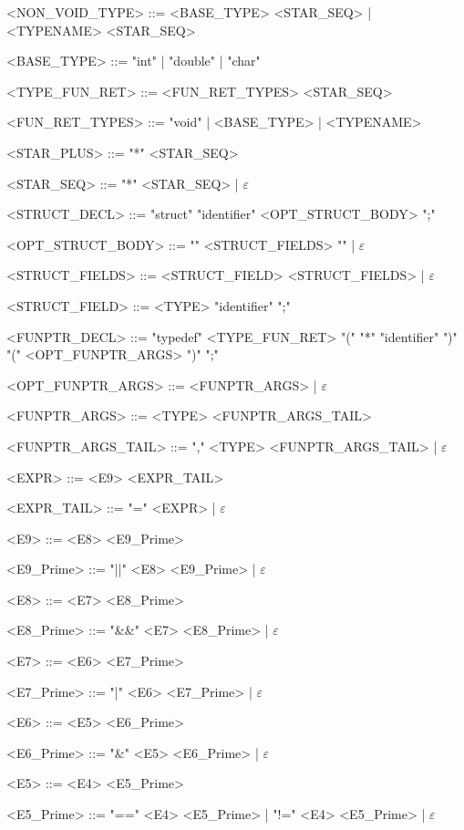 \begin{grammar}
<NON\_VOID\_TYPE> ::= <BASE\_TYPE> <STAR\_SEQ>
                    | <TYPENAME> <STAR\_SEQ>

<BASE\_TYPE> ::= "int"
               | "double"
               | "char"

<TYPE\_FUN\_RET> ::= <FUN\_RET\_TYPES> <STAR\_SEQ>

<FUN\_RET\_TYPES> ::= "void"
                    | <BASE\_TYPE>
                    | <TYPENAME>

<STAR\_PLUS> ::= "*" <STAR\_SEQ>

<STAR\_SEQ> ::= "*" <STAR\_SEQ>
              | $\varepsilon$

<STRUCT\_DECL> ::= "struct" "identifier" <OPT\_STRUCT\_BODY> ";"

<OPT\_STRUCT\_BODY> ::= "{" <STRUCT\_FIELDS> "}"
                      | $\varepsilon$

<STRUCT\_FIELDS> ::= <STRUCT\_FIELD> <STRUCT\_FIELDS>
                   | $\varepsilon$

<STRUCT\_FIELD> ::= <TYPE> "identifier" ";"

<FUNPTR\_DECL> ::= "typedef" <TYPE\_FUN\_RET> "(" "*" "identifier" ")" "(" <OPT\_FUNPTR\_ARGS> ")" ";"

<OPT\_FUNPTR\_ARGS> ::= <FUNPTR\_ARGS>
                      | $\varepsilon$

<FUNPTR\_ARGS> ::= <TYPE> <FUNPTR\_ARGS\_TAIL>

<FUNPTR\_ARGS\_TAIL> ::= "," <TYPE> <FUNPTR\_ARGS\_TAIL>
                       | $\varepsilon$

<EXPR> ::= <E9> <EXPR\_TAIL>

<EXPR\_TAIL> ::= "=" <EXPR>
               | $\varepsilon$

<E9> ::= <E8> <E9\_Prime>

<E9\_Prime> ::= "||" <E8> <E9\_Prime>
              | $\varepsilon$

<E8> ::= <E7> <E8\_Prime>

<E8\_Prime> ::= "&&" <E7> <E8\_Prime>
              | $\varepsilon$

<E7> ::= <E6> <E7\_Prime>

<E7\_Prime> ::= "|" <E6> <E7\_Prime>
              | $\varepsilon$

<E6> ::= <E5> <E6\_Prime>

<E6\_Prime> ::= "&" <E5> <E6\_Prime>
              | $\varepsilon$

<E5> ::= <E4> <E5\_Prime>

<E5\_Prime> ::= "==" <E4> <E5\_Prime>
              | "!=" <E4> <E5\_Prime>
              | $\varepsilon$


\end{grammar}
